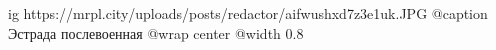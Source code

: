  
 
 
 
 

\ifcmt
  ig https://mrpl.city/uploads/posts/redactor/aifwushxd7z3e1uk.JPG
	@caption Эстрада послевоенная
  @wrap center
  @width 0.8
\fi
